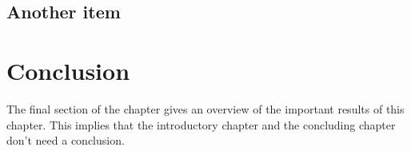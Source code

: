 \subsection{Another item}
\lipsum[56-57]

\section{Conclusion}
The final section of the chapter gives an overview of the important results
of this chapter. This implies that the introductory chapter and the
concluding chapter don't need a conclusion.

\lipsum[66]

